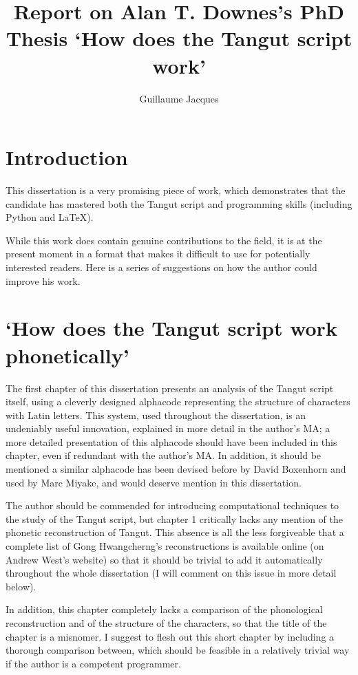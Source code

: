 \documentclass[oneside,a4paper,11pt]{article}
\begin{document}
 

\title{Report on Alan T. Downes's PhD Thesis `How does the Tangut script work'}
\author{Guillaume Jacques}
\maketitle

\section*{Introduction}
This dissertation is a very promising piece of work, which demonstrates that the candidate has mastered both the Tangut script and programming skills (including Python and \LaTeX). 

While this work does contain genuine contributions to the field, it is at the present moment in a format that makes it difficult to use for potentially interested readers. Here is a series of suggestions on how the author could improve his work.


\section{`How does the Tangut script work phonetically'}
The first chapter of this dissertation presents an analysis of the Tangut script itself, using a cleverly designed alphacode representing the structure of characters with Latin letters. This system, used throughout the dissertation, is an undeniably useful innovation, explained in more detail in the author's MA; a more detailed presentation of this alphacode should have been included in this chapter, even if redundant with the author's MA. In addition, it should be mentioned a similar alphacode has been devised before by David Boxenhorn and used by Marc Miyake, and would deserve mention in this dissertation.

The author should be commended for introducing computational techniques to the study of the Tangut script, but chapter 1 critically lacks any mention of the phonetic reconstruction of Tangut. This absence is all the less forgiveable that a complete list of Gong Hwangcherng's reconstructions  is available online (on Andrew West's website) so that it should be trivial to add it automatically throughout the whole dissertation (I will comment on this issue in more detail below).

In addition, this chapter completely lacks a comparison of the phonological reconstruction and of the structure of the characters, so that the title of the chapter is a misnomer. I suggest to flesh out this short chapter by including a thorough comparison between, which should be feasible in a relatively trivial way if the author is a competent programmer.
\end{document}
